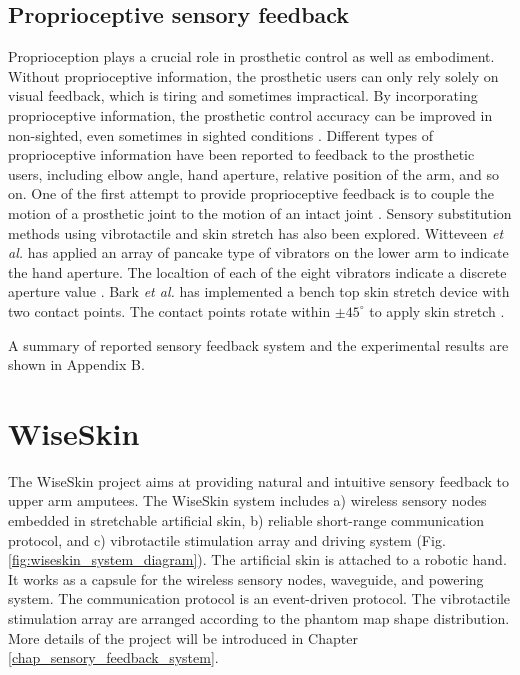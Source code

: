 \subsection{Proprioceptive sensory feedback}
Proprioception plays a crucial role in prosthetic control as well as embodiment. Without proprioceptive information, the prosthetic users can only rely solely on visual feedback, which is tiring and sometimes impractical. By incorporating proprioceptive information, the prosthetic control accuracy can be improved in non-sighted, even sometimes in sighted conditions \cite{blank2010identifying}. Different types of proprioceptive information  have been reported to feedback to the prosthetic users, including elbow angle, hand aperture, relative position of the arm, and so on. One of the first attempt to provide proprioceptive feedback is to couple the motion of a prosthetic joint to the motion of an intact joint \cite{simpson1974choice, pistohl2015artificial}. Sensory substitution methods using vibrotactile \cite{kapur2010spatially, witteveen2015vibrotactile, bark2008comparison} and skin stretch has also been explored. Witteveen \textit{et al.} has applied an array of pancake type of vibrators on the lower arm to indicate the hand aperture. The localtion of each of the eight vibrators indicate a discrete aperture value \cite{witteveen2015vibrotactile}.  Bark \textit{et al.} has implemented a bench top skin stretch device with two contact points. The contact points rotate within $\pm 45 ^{\circ} $ to apply skin stretch \cite{bark2008comparison}. 


A summary of reported sensory feedback system and the experimental results are shown in Appendix B. 


\section{WiseSkin}
The WiseSkin project aims at providing natural and intuitive sensory feedback to upper arm amputees. The WiseSkin system includes a) wireless sensory nodes embedded in stretchable artificial skin, b) reliable short-range communication protocol, and c) vibrotactile stimulation array and driving system  (Fig. \ref{fig:wiseskin_system_diagram}). The artificial skin is attached to a robotic hand. It works as a capsule for the wireless sensory nodes, waveguide, and powering system. The communication protocol is an event-driven protocol. The vibrotactile stimulation array are arranged according to the phantom map shape distribution. More details of the project will be introduced in Chapter \ref{chap_sensory_feedback_system}. 

